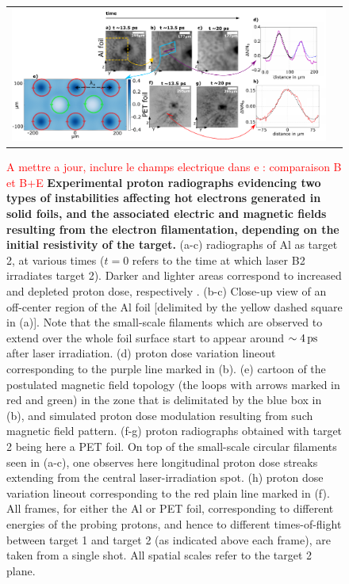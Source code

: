 \documentclass[aps,twocolumn,showpacs,superscriptaddress]{revtex4}
\begin{document}
\begin{figure}[tbh!]
\begin{tabular}{cc}
\includegraphics[scale = 0.6]{panel_v5.pdf}
\end{tabular}
 \caption{\label{fig:radio} 
\textcolor{red}{A mettre a jour, inclure le champs electrique dans e : comparaison B et B+E}
\textbf{Experimental proton radiographs evidencing two types of instabilities affecting hot electrons generated in solid foils, and the associated electric and magnetic fields resulting from the electron filamentation, depending on the initial resistivity of the target.  }
(a-c) radiographs of Al as target 2, at various times ($t=0$ refers to the time at which laser B2 irradiates target 2). Darker and lighter areas correspond to increased and depleted proton dose, respectively \cite{RSI_Albertazzi_2015}. 
(b-c) Close-up view of an off-center region of the Al foil [delimited by the yellow dashed square in (a)]. 
Note that the small-scale filaments  which are observed to extend over the whole foil surface start to appear around $\sim 4\,\rm ps$ after laser irradiation.
(d) proton dose variation lineout corresponding to  the purple line  marked in (b). 
(e) cartoon of the postulated magnetic field topology (the loops with arrows marked in red and green) in the zone that is delimitated by the blue box in (b), and simulated proton dose modulation resulting from such magnetic field pattern. 
(f-g) proton radiographs obtained with target 2 being here a PET foil. On top of the small-scale circular filaments seen in (a-c), one observes here longitudinal proton dose streaks extending from the central laser-irradiation spot. 
(h) proton dose variation lineout corresponding to the red plain line marked in (f).
All frames, for either the Al or PET foil, corresponding to different energies of the probing protons, and hence to different times-of-flight between target 1 and target 2 (as indicated above each frame), are taken from a single shot. All spatial scales refer to the target 2 plane.
}
\end{figure}
\end{document}
